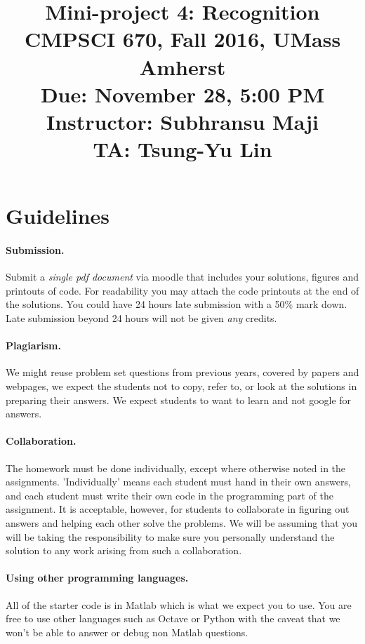 \documentclass[10pt,letterpaper]{article}
\title{
  \textbf{Mini-project 4: Recognition} \\
  \Large{CMPSCI 670, Fall 2016, UMass Amherst} \\
  \Large{Due:  November 28, 5:00 PM } \\
  \Large{Instructor: Subhransu Maji} \\
  \Large{TA: Tsung-Yu Lin}
}
\date{}
\begin{document}
\maketitle

\renewcommand\thesubsection{\thesection.\alph{subsection}}


\section*{Guidelines}

\paragraph{Submission.} Submit a \emph{single pdf document} via moodle that includes your solutions, figures and printouts of code. For readability you may attach the code printouts at the end of the solutions. You could have 24 hours late submission with a 50\% mark down. Late submission beyond 24 hours will not be given \emph{any} credits. 

\paragraph{Plagiarism.} We might reuse problem set questions from previous years, covered by papers and webpages, we expect the students not to copy, refer to, or look at the solutions in preparing their answers. We expect students to want to learn and not google for answers. 

\paragraph{Collaboration.} The homework must be done individually, except where otherwise noted in the assignments. 'Individually' means each student must hand in their own answers, and each student must write their own code in the programming part of the assignment. It is acceptable, however, for students to collaborate in figuring out answers and helping each other solve the problems. We will be assuming that you will be taking the responsibility to make sure you personally understand the solution to any work arising from such a collaboration.

\paragraph{Using other programming languages.} All of the starter code is in Matlab which is what we expect you to use. You are free to use other languages such as Octave or Python with the caveat that we won't be able to answer or debug non Matlab questions.
\end{document}
